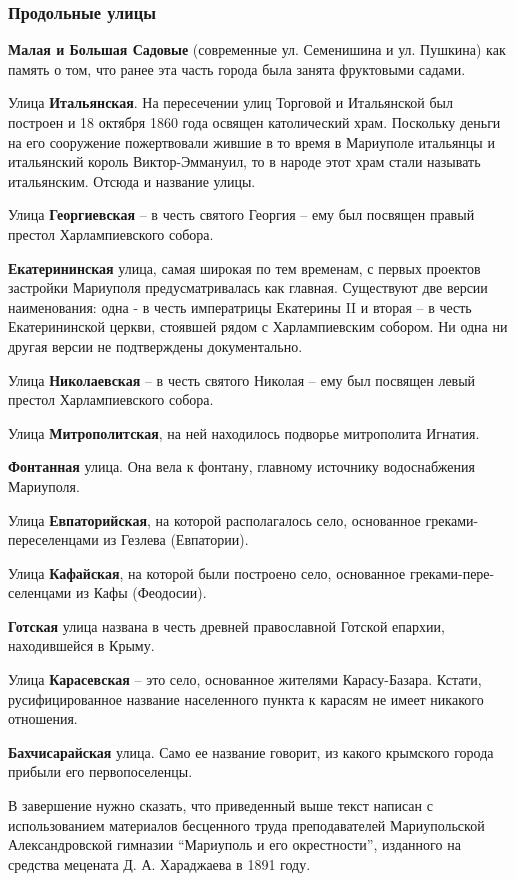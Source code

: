\subsubsection{Продольные улицы}

\textbf{Малая и Большая Садовые} (современные ул. Семенишина и ул. Пушкина) как память о
том, что ранее эта часть города была занята фруктовыми садами.

Улица \textbf{Итальянская}. На пересечении улиц Торговой и Итальянской был построен  и
18 октября 1860 года освящен католический храм. Поскольку деньги на его
сооружение пожертвовали жившие в то время в Мариуполе итальянцы и итальянский
король Виктор-Эммануил, то в народе этот храм стали называть итальянским.
Отсюда и название улицы.

Улица \textbf{Георгиевская} – в честь святого Георгия – ему был посвящен правый престол
Харлампиевского собора.

\textbf{Екатерининская} улица, самая широкая по тем временам, с первых проектов
застройки Мариуполя предусматривалась как главная. Существуют две версии
наименования: одна - в честь императрицы Екатерины II и вторая – в честь
Екатерининской церкви, стоявшей рядом с Харлампиевским собором. Ни одна ни
другая версии не подтверждены документально.

Улица \textbf{Николаевская} – в честь святого Николая – ему был посвящен левый престол Харлампиевского собора.

Улица \textbf{Митрополитская}, на ней находилось подворье митрополита Игнатия.

\textbf{Фонтанная} улица. Она вела к фонтану, главному источнику водоснабжения Мариуполя.

Улица \textbf{Евпаторийская}, на которой располагалось село, основанное  греками-переселенцами из Гезлева (Евпатории).

Улица \textbf{Кафайская}, на которой были построено село, основанное  греками-пере\hyp{}селенцами из Кафы (Феодосии).

\textbf{Готская} улица названа в честь древней  православной Готской епархии, находившейся  в Крыму.

Улица \textbf{Карасевская} – это село, основанное жителями Карасу-Базара.
Кстати, русифицированное название населенного пункта к карасям не имеет
никакого отношения.

\textbf{Бахчисарайская} улица. Само ее название говорит, из какого крымского города прибыли его первопоселенцы.

В завершение нужно сказать, что приведенный выше текст написан с использованием
материалов бесценного труда преподавателей Мариупольской Александровской
гимназии \enquote{Мариуполь и его окрестности}, изданного на средства мецената
Д. А. Хараджаева в 1891 году.

